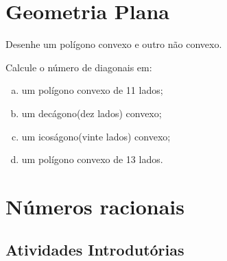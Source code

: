 

\section{Geometria Plana}


\item Desenhe um polígono convexo e outro não convexo.
\item Calcule o número de diagonais em:
\begin{multicols}{2}
\begin{enumerate}[a)]
\item um polígono convexo de 11 lados;
\item um decágono(dez lados) convexo;
\item um icoságono(vinte lados) convexo;
\item um polígono convexo de 13 lados.
\end{enumerate}
\end{multicols}



\section{Números racionais}
\subsection{Atividades Introdutórias}


